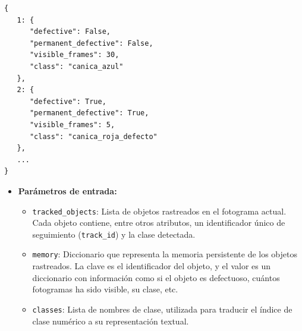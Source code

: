 \documentclass[11pt,spanish,listoffigures,listoftables]{tfgetsinf}
\begin{document}
\begin{lstlisting}[style=seguimiento, caption={Ejemplo de memoria de seguimiento}]
{
   1: {
      "defective": False,
      "permanent_defective": False,
      "visible_frames": 30,
      "class": "canica_azul"
   },
   2: {
      "defective": True,
      "permanent_defective": True,
      "visible_frames": 5,
      "class": "canica_roja_defecto"
   },
   ...
}
\end{lstlisting}


\begin{itemize}
   \item \textbf{Parámetros de entrada:}
   \begin{itemize}
      \item \texttt{tracked\_objects}: Lista de objetos rastreados en el fotograma actual. Cada objeto contiene, entre otros atributos, un identificador único de seguimiento (\texttt{track\_id}) y la clase detectada.
      \item \texttt{memory}: Diccionario que representa la memoria persistente de los objetos rastreados. La clave es el identificador del objeto, y el valor es un diccionario con información como si el objeto es defectuoso, cuántos fotogramas ha sido visible, su clase, etc.
      \item \texttt{classes}: Lista de nombres de clase, utilizada para traducir el índice de clase numérico a su representación textual.
   \end{itemize}


\end{itemize}
\end{document}
